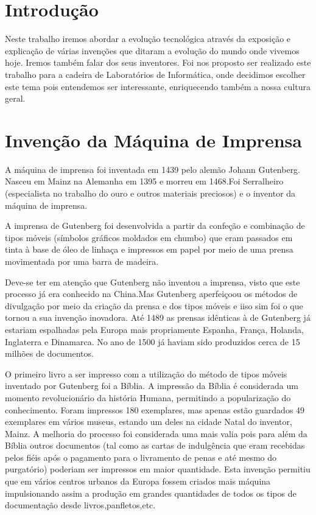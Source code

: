 \documentclass{report}
\begin{document}
\clearpage
{}

\chapter{Introdução}
\label{chap.introducao}

Neste trabalho iremos abordar a evolução tecnológica através da exposição e explicação de várias invenções que ditaram a evolução do mundo onde vivemos hoje. Iremos também falar dos seus inventores.
Foi nos proposto ser realizado este trabalho para a cadeira de Laboratórios de Informática, onde decidimos escolher este tema pois entendemos ser interessante, enriquecendo também a nossa cultura geral.  


\chapter{Invenção da Máquina de Imprensa}

A máquina de imprensa foi inventada em 1439 pelo alemão Johann Gutenberg. Nasceu em Mainz na Alemanha em 1395 e morreu em 1468.Foi Serralheiro (especialista no trabalho do ouro e outros materiais preciosos) e o inventor da máquina de imprensa.

A imprensa de Gutenberg foi desenvolvida a partir da confeção e combinação de tipos móveis (símbolos gráficos moldados em chumbo) que eram passados em tinta à base de óleo de linhaça e impressos em papel por meio de uma prensa movimentada por uma barra de madeira.

Deve-se ter em atenção que Gutenberg não inventou a imprensa, visto que este processo já era conhecido na China.Mas Gutenberg aperfeiçoou os métodos de divulgação por meio da criação da prensa e dos tipos móveis e iiso sim foi o que tornou a sua invenção inovadora. Até 1489 as prensas idênticas à de Gutenberg já estariam espalhadas pela Europa mais propriamente Espanha, França, Holanda, Inglaterra e Dinamarca. No ano de 1500 já haviam sido produzidos cerca de 15 milhões de documentos. 

O primeiro livro a ser impresso com a utilização do método de tipos móveis inventado por Gutenberg foi a Bíblia. A impressão da Bíblia é considerada um momento revolucionário da história Humana, permitindo a popularização do conhecimento. Foram impressos 180 exemplares, mas apenas estão guardados 49 exemplares em vários museus, estando um deles na cidade Natal do inventor, Mainz.
 \pagebreak
A melhoria do processo foi considerada uma mais valia pois para além da Bíblia outros documentos (tal como as cartas de indulgência que eram recebidas pelos fiéis após o pagamento para o livramento de penas e até mesmo do purgatório) poderiam ser impressos em maior quantidade. 
Esta invenção permitiu que em vários centros urbanos da Europa fossem criados mais máquina impulsionando assim a produção em grandes quantidades de todos os tipos de documentação desde livros,panfletos,etc.
\end{document}
